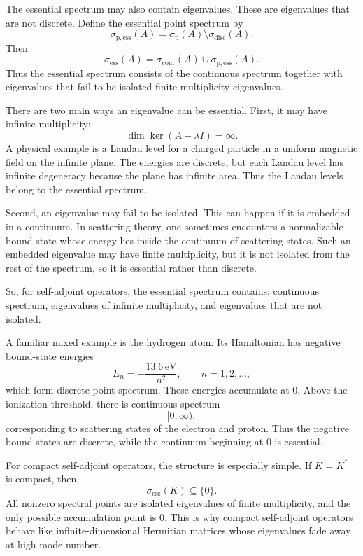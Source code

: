\documentclass[JHEP,12pt]{article}
\begin{document}
The essential spectrum may also contain eigenvalues. These are eigenvalues that
are not discrete. Define the essential point spectrum by
\[
\sigma_{\mathrm{p,ess}}(A)
=
\sigma_{\mathrm p}(A)\setminus\sigma_{\mathrm{disc}}(A).
\]
Then
\[
\sigma_{\mathrm{ess}}(A)
=
\sigma_{\mathrm{cont}}(A)
\cup
\sigma_{\mathrm{p,ess}}(A).
\]
Thus the essential spectrum consists of the continuous spectrum together with
eigenvalues that fail to be isolated finite-multiplicity eigenvalues.

There are two main ways an eigenvalue can be essential. First, it may have
infinite multiplicity:
\[
\dim\ker(A-\lambda I)=\infty .
\]
A physical example is a Landau level for a charged particle in a uniform
magnetic field on the infinite plane. The energies are discrete, but each
Landau level has infinite degeneracy because the plane has infinite area. Thus
the Landau levels belong to the essential spectrum.

Second, an eigenvalue may fail to be isolated. This can happen if it is
embedded in a continuum. In scattering theory, one sometimes encounters a
normalizable bound state whose energy lies inside the continuum of scattering
states. Such an embedded eigenvalue may have finite multiplicity, but it is not
isolated from the rest of the spectrum, so it is essential rather than
discrete.

So, for self-adjoint operators, the essential spectrum contains: continuous spectrum, eigenvalues of infinite multiplicity, and eigenvalues that are not isolated.

A familiar mixed example is the hydrogen atom. Its Hamiltonian has negative
bound-state energies
\[
E_n=-\frac{13.6\,\mathrm{eV}}{n^2},
\qquad n=1,2,\ldots,
\]
which form discrete point spectrum. These energies accumulate at \(0\). Above
the ionization threshold, there is continuous spectrum
\[
[0,\infty),
\]
corresponding to scattering states of the electron and proton. Thus the
negative bound states are discrete, while the continuum beginning at \(0\) is
essential.

For compact self-adjoint operators, the structure is especially simple. If
\(K=K^\ast\) is compact, then
\[
\sigma_{\mathrm{ess}}(K)\subseteq\{0\}.
\]
All nonzero spectral points are isolated eigenvalues of finite multiplicity,
and the only possible accumulation point is \(0\). This is why compact
self-adjoint operators behave like infinite-dimensional Hermitian matrices
whose eigenvalues fade away at high mode number.
\end{document}
